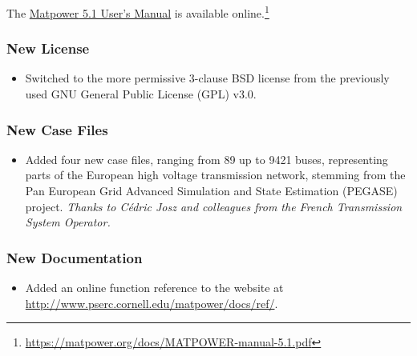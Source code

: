 \documentclass[12pt]{article}
\newcommand{\matpower}[0]{{\sc Matpower}}
\numberwithin{equation}{section}
\numberwithin{table}{section}
\numberwithin{figure}{section}
\begin{document}
\begin{appendices}
The \href{https://matpower.org/docs/MATPOWER-manual-5.1.pdf}{\matpower{} 5.1 User's Manual} is available online.\footnote{\url{https://matpower.org/docs/MATPOWER-manual-5.1.pdf}}

\subsubsection*{New License}
\begin{itemize}
\item Switched to the more permissive 3-clause BSD license from the previously used GNU General Public License (GPL) v3.0.
\end{itemize}

\subsubsection*{New Case Files}
\begin{itemize}
\item Added four new case files, ranging from 89 up to 9421 buses, representing parts of the European high voltage transmission network, stemming from the Pan European Grid Advanced Simulation and State Estimation (PEGASE) project. \emph{Thanks to C\'edric Josz and colleagues from the French Transmission System Operator.}
\end{itemize}

\subsubsection*{New Documentation}
\begin{itemize}
\item Added an online function reference to the website at \url{http://www.pserc.cornell.edu/matpower/docs/ref/}.
\end{itemize}


\end{appendices}
\end{document}
